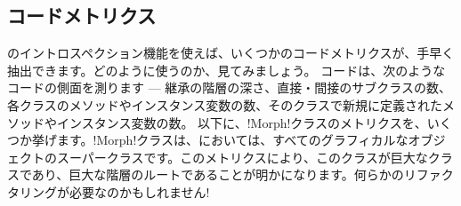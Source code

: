 \documentclass[a4paper,10pt,twoside]{book}
\begin{document}
\important{\emph{警告:}これらの機能は、とりわけ開発ツールを定義するのに便利ですが、典型的なアプリケーションには、通常、適していません。
オブジェクトに、それが属するクラスを尋ねたり、オブジェクトがどのようなメッセージを理解するかを見つけ出そうと、それにクエリを送ったりすることは、典型的な設計上の欠陥を示すものです。なぜならそれは、カプセル化の原則を破る行為だからです。
開発ツールは、しかしながら、通常のアプリケーションではありません。なぜなら、開発ツールは、ソフトウェアそれ自身を対象領域とするものだからです。それで、これらのツールは、コードの内部の詳細について、深く掘り下げることを許されているのです。}


\subsection{コードメトリクス}

\st{}のイントロスペクション機能を使えば、いくつかのコードメトリクスが、手早く抽出できます。どのように使うのか、見てみましょう。
コードは、次のようなコードの側面を測ります --- 継承の階層の深さ、直接・間接のサブクラスの数、各クラスのメソッドやインスタンス変数の数、そのクラスで新規に定義されたメソッドやインスタンス変数の数。
以下に、\ct!Morph!クラスのメトリクスを、いくつか挙げます。\ct!Morph!クラスは、\pharo{}においては、すべてのグラフィカルなオブジェクトのスーパークラスです。このメトリクスにより、このクラスが巨大なクラスであり、巨大な階層のルートであることが明かになります。何らかのリファクタリングが必要なのかもしれません! 
\end{document}
